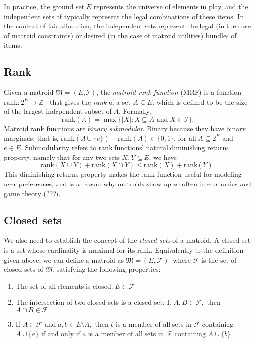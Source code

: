 In practice, the ground set $E$ represents the universe of elements in play, and the independent sets of typically represent the legal combinations of these items. In the context of fair allocation, the independent sets represent the legal (in the case of matroid constraints) or desired (in the case of matroid utilities) bundles of items.

\subsection*{Rank}
Given a matroid $\mathfrak{M} = (E, \mathcal{I})$, the \textit{matroid rank function} (MRF) is a function $\text{rank} : 2^E \to \mathbb{Z}^+$ that gives the \textit{rank} of a set $ A \subseteq E$, which is defined to be the size of the largest independent subset of $A$. Formally, $$\text{rank}(A) = \max\{|X| : X \subseteq A \text{ and } X \in \mathcal{I}\}.$$ Matroid rank functions are \textit{binary submodular}. Binary because they have binary marginals, that is, $\text{rank}(A \cup \{ e \}) - \text{rank}(A) \in \{0,1\}$, for all $A \subseteq 2^E$ and $e \in E$. Submodularity refers to rank functions' natural diminishing returns property, namely that for any two sets $X, Y \subseteq E$, we have $$\text{rank}(X \cup Y) + \text{rank}(X \cap Y) \leq \text{rank}(X) + \text{rank}(Y).$$ This diminishing returns property makes the rank function useful for modeling user preferences, and is a reason why matroids show up so often in economics and game theory (???).

\subsection*{Closed sets}

We also need to establish the concept of the \textit{closed sets} of a matroid. A closed set is a set whose cardinality is maximal for its rank. Equivalently to the definition given above, we can define a matroid as $\mathfrak{M} = (E, \mathcal{F})$, where $\mathcal{F}$ is the set of closed sets of $\mathfrak{M}$, satisfying the following properties:

\begin{enumerate}
  \item The set of all elements is closed: $E \in \mathcal{F}$
  \item The intersection of two closed sets is a closed set: If $A,B \in \mathcal{F},$ then $A \cap B \in \mathcal{F}$
  \item If $A \in \mathcal{F}$ and $a,b \in E \setminus A,$ then $b$ is a member of all sets in $\mathcal{F}$ containing $A \cup \{a\}$ if and only if $a$ is a member of all sets in $\mathcal{F}$ containing $A \cup \{b\}$
\end{enumerate}

